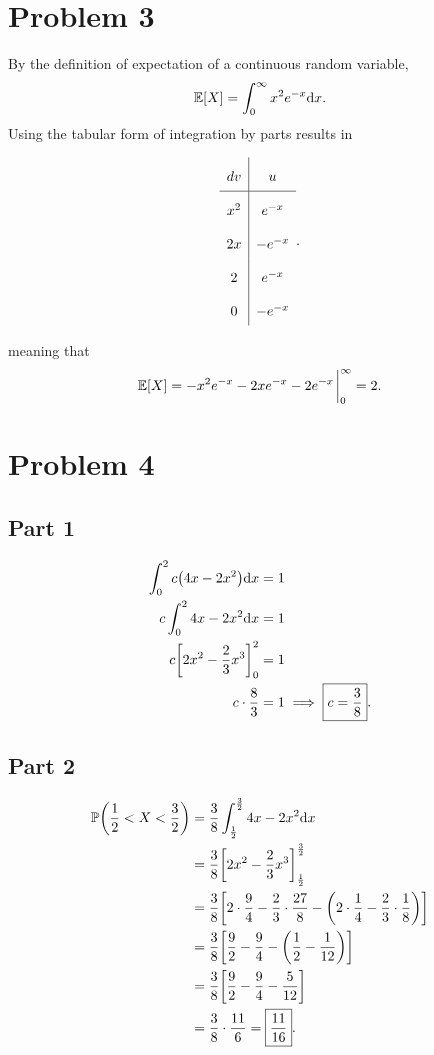 \documentclass[12pt]{extarticle}
\begin{document}
\section*{Problem 3}
% 
% 
By the definition of expectation of a continuous random variable,
\[
	\mathbb{E}\qty[X] = \int_0^\infty x^2 e^{-x} \dd x
.\]
Using the tabular form of integration by parts results in
\begin{center}
	\[
		\renewcommand\arraystretch{2}
		\begin{array}{c | c}
			dv & u \\\hline
			x^2 & e^{-x} \\
			2x & -e^{-x} \\
			2 & e^{-x} \\
			0 & -e^{-x}
		\end{array}
	.\]
\end{center}
meaning that
\[
	\Exp{X} = -x^2 e^{-x} - 2x e^{-x} - 2e^{-x} \eval_0^{\infty} = 2
.\]

\section*{Problem 4}
\subsection*{Part 1}
\begin{align*}
	\int_0^2 c\qty(4x - 2x^2) \dd x &= 1 \\
	c \int_0^2 4x - 2x^2 \dd x &= 1 \\
	c \qty[2x^2 - \frac{2}{3}x^3 ]_0^2 &= 1 \\
	c \cdot \frac{8}{3} &= 1 \implies \boxed{c = \frac{3}{8}}
.\end{align*}

\subsection*{Part 2}
\begin{align*}
	\mathbb{P}\qty(\frac{1}{2} < X < \frac{3}{2}) &= \frac{3}{8} \int_{\frac{1}{2}}^{\frac{3}{2}} 4x - 2x^2 \dd x \\
										 &= \frac{3}{8} \qty[2x^2 - \frac{2}{3} x^3]_{\frac{1}{2}}^{\frac{3}{2}} \\
										 &= \frac{3}{8} \qty[2\cdot \frac{9}{4} - \frac{2}{3} \cdot \frac{27}{8} - \qty(2 \cdot \frac{1}{4} - \frac{2}{3} \cdot \frac{1}{8})] \\
										 &= \frac{3}{8} \qty[\frac{9}{2} - \frac{9}{4} - \qty(\frac{1}{2} - \frac{1}{12})] \\
										 &= \frac{3}{8} \qty[\frac{9}{2} - \frac{9}{4} - \frac{5}{12}] \\
										 &= \frac{3}{8} \cdot \frac{11}{6} = \boxed{\frac{11}{16}}
.\end{align*}
\end{document}
